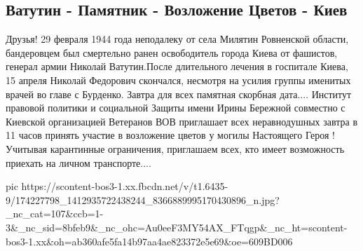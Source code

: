  
 
 
 
 

\subsection{Ватутин - Памятник - Возложение Цветов - Киев}
\label{sec:14_04_2021.fb.berezhnaja_irina.1.kiev_vatutin_cvety_pamjatnik}

Друзья! 29 февраля 1944 года неподалеку от села Милятин Ровненской области,
бандеровцем был смертельно ранен освободитель города Киева от фашистов,
генерал армии Николай Ватутин.После длительного лечения в госпитале Киева, 15
апреля Николай Федорович скончался, несмотря на усилия группы именитых врачей
во главе с Бурденко. Завтра для всех памятная скорбная дата.... Институт
правовой политики и социальной Защиты имени Ирины Бережной совместно с Киевской
организацией Ветеранов ВОВ приглашает  всех неравнодушных  завтра в 11 часов
принять участие в возложение цветов у могилы Настоящего Героя ! Учитывая
карантинные ограничения, приглашаем всех, кто имеет возможность приехать на
личном транспорте....


\ifcmt
  pic https://scontent-bos3-1.xx.fbcdn.net/v/t1.6435-9/174227798_1412935722438244_8366889995170430896_n.jpg?_nc_cat=107&ccb=1-3&_nc_sid=8bfeb9&_nc_ohc=Au0eeF3MY54AX_FTqgp&_nc_ht=scontent-bos3-1.xx&oh=ab360afe5fa14b97aa4ae823372e5e69&oe=609BD006
\fi

